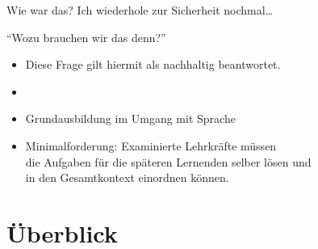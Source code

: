 \begin{frame}
  {Wie war das?}
  Ich wiederhole zur Sicherheit nochmal\ldots\\
  \Zeile
  \onslide<+->
  \begin{center}
    \Large{}
  \end{center}
\end{frame}

\begin{frame}
  {"`Wozu brauchen wir das denn?"'}
  \onslide<+->
  \begin{itemize}[<+->]
    \item Diese Frage gilt hiermit als nachhaltig beantwortet.
      \Zeile
    \item {}
    \item Grundausbildung im \alert{Umgang mit Sprache} 
      \Zeile
    \item Minimalforderung: \alert{Examinierte Lehrkräfte müssen\\
      die Aufgaben für die späteren Lernenden selber lösen und\\
      in den Gesamtkontext einordnen können.}
  \end{itemize}
\end{frame}

\section{Überblick}

